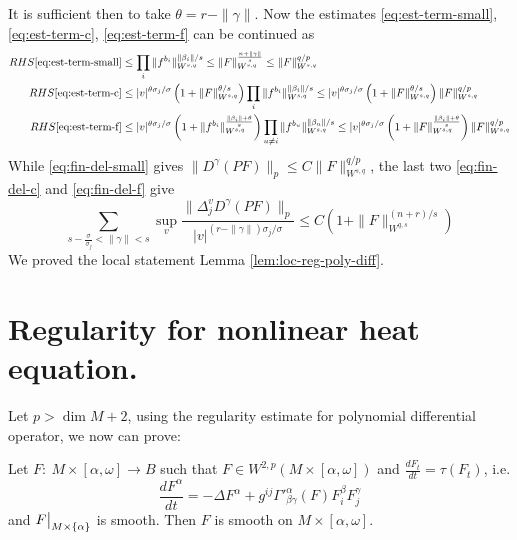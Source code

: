 It is sufficient then to take \(\theta = r- \|\gamma\|\). Now the estimates
\eqref{eq:est-term-small}, \eqref{eq:est-term-c}, \eqref{eq:est-term-f} can be continued as
\begin{align}
  RHS \eqref{eq:est-term-small} &\leq \prod_i \|f^{b_i}\|^{\|\beta_i\|/s}_{W^{s,q}} \leq \|F\|_{W^{s,q}}^{\frac{n+\|\gamma\|}{s}} \leq \|F\|_{W^{s,q}}^{q/p}\label{eq:fin-del-small}\\
  RHS \eqref{eq:est-term-c} &\leq |v|^{\theta\sigma_j/\sigma}\left( 1 + \|F\|_{W^{s,q}}^{\theta/s} \right)\prod_i \|f^{b_i}\|^{\|\beta_i\|/s}_{W^{s,q}}\leq |v|^{\theta\sigma_j/\sigma}\left( 1 + \|F\|_{W^{s,q}}^{\theta/s} \right)\|F\|_{W^{s,q}}^{q/p} \label{eq:fin-del-c}\\
  RHS \eqref{eq:est-term-f} &\leq |v|^{\theta\sigma_j/\sigma}\left( 1 + \|f^{b_i}\|_{W^{s,q}}^{\frac{\|\beta_i\| +\theta}{s}} \right)\prod_{u\ne i} \|f^{b_u}\|^{\|\beta_u\|/s}_{W^{s,q}}\leq |v|^{\theta\sigma_j/\sigma}\left( 1 + \|F\|_{W^{s,q}}^{\frac{\|\beta_i\| +\theta}{s}} \right)\|F\|_{W^{s,q}}^{q/p} \label{eq:fin-del-f}
\end{align}
While \eqref{eq:fin-del-small} gives \(\|D^\gamma (PF)\|_p \leq C \|F\|_{W^{s,q}}^{q/p}\),
the last two \eqref{eq:fin-del-c} and \eqref{eq:fin-del-f} give
\[
 \sum_{ s- \frac{\sigma}{\sigma_j} < \|\gamma\| < s}\sup_{v} \frac{\|\Delta^v_j D^\gamma (PF) \|_p}{|v|^{(r-\|\gamma\|)\sigma_j/\sigma}} \leq C \left(
1 + \|F\|^{(n+r)/s}_{W^{q,s}}\right)
\]
We proved the local statement Lemma \ref{lem:loc-reg-poly-diff}.

\section{Regularity for nonlinear heat equation.}
\label{sec:orge66e875}
Let \(p>\dim M + 2\), using the regularity estimate for polynomial differential
operator, we now can prove:

\begin{theorem}
\label{thm:reg-nonlin-heat}
Let \(F:\ M\times [\alpha,\omega] \longrightarrow B\) such that \(F\in W^{2,p}(M\times
[\alpha,\omega])\) and \(\frac{d F_t}{dt} = \tau(F_t)\), i.e.
\[
 \frac{d F^\alpha}{dt} = -\Delta F^\alpha + g^{ij}\Gamma'^\alpha_{\beta\gamma}(F)
F^\beta_i F^\gamma_j
\]
and \(\restr{F}{M\times\{\alpha\}}\) is smooth. Then \(F\) is smooth on \(M\times [\alpha,\omega]\).
\end{theorem}

